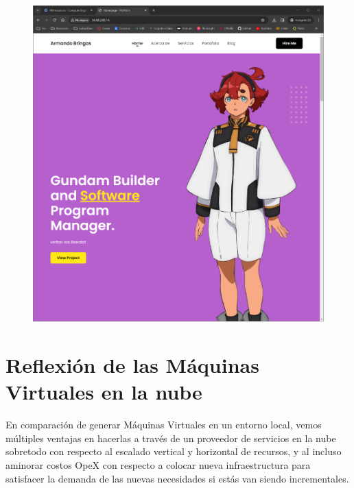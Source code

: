 \documentclass[12pt,a4paper]{article}
\begin{document}
\begin{figure}[H]
    \centering
    \includegraphics[width=1\linewidth]{M4_Servicios_Cómputo_en_la_Nube/Tarea_5_Creación_Máquinas_Virtuales_en_Nube/reporte/figuras/2_4_2_Carga_archivos.png}
    \label{fig:Google_7}
\end{figure}

\vspace{5em}

\section{Reflexión de las Máquinas Virtuales en la nube}

En comparación de generar Máquinas Virtuales en un entorno local, vemos múltiples ventajas en hacerlas a través de un proveedor de servicios en la nube sobretodo con respecto al escalado vertical y horizontal de recursos, y al incluso aminorar costos OpeX con respecto a colocar nueva infraestructura para satisfacer la demanda de las nuevas necesidades si estás van siendo incrementales.

\vspace{1em}
\end{document}
